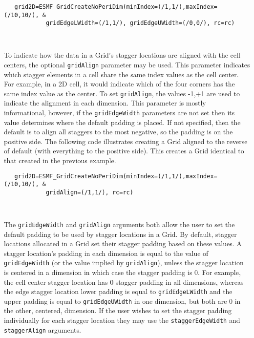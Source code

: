  \begin{verbatim}
   grid2D=ESMF_GridCreateNoPeriDim(minIndex=(/1,1/),maxIndex=(/10,10/), &
            gridEdgeLWidth=(/1,1/), gridEdgeUWidth=(/0,0/), rc=rc)

 
\end{verbatim}
 

   To indicate how the data in a Grid's stagger locations are aligned with the
   cell centers, the optional {\tt gridAlign} parameter
   may be used. This parameter indicates which stagger elements
   in a cell share the same index values as the cell center.
   For example, in a 2D cell, it would indicate which of the four corners has
   the same index value as the center. To set {\tt gridAlign},
   the values -1,+1 are used to indicate the alignment in
   each dimension. This parameter is mostly
   informational, however, if the {\tt gridEdgeWidth} parameters
   are not set then its value determines where the default padding
   is placed. If not specified, then the default is to align all
   staggers to the most negative, so the padding is on the positive side.
   The following code illustrates creating a Grid aligned to the reverse of
   default (with everything to the positive side). This creates a
   Grid identical to that created in the previous example. 

 \begin{verbatim}
   grid2D=ESMF_GridCreateNoPeriDim(minIndex=(/1,1/),maxIndex=(/10,10/), &
            gridAlign=(/1,1/), rc=rc)

 
\end{verbatim}
 

   The {\tt gridEdgeWidth} and {\tt gridAlign} arguments both
   allow the user to set the default padding to be used
   by stagger locations in a Grid. By default, stagger locations
   allocated in a Grid set their stagger padding based on these
   values.  A stagger location's padding in each dimension is
   equal to the value of {\tt gridEdgeWidth} (or the value implied
   by {\tt gridAlign}), unless the stagger location is centered
   in a dimension in which case the stagger padding is 0. For example,
   the cell center stagger location has 0 stagger padding in all
   dimensions, whereas the edge stagger location lower padding
   is equal to {\tt gridEdgeLWidth} and the upper padding is equal
   to {\tt gridEdgeUWidth} in one dimension, but both are 0 in the other,
   centered, dimension.  If the user wishes to set the stagger padding
   individually for each stagger location they may use the
   {\tt staggerEdgeWidth} and {\tt staggerAlign} arguments.
  
